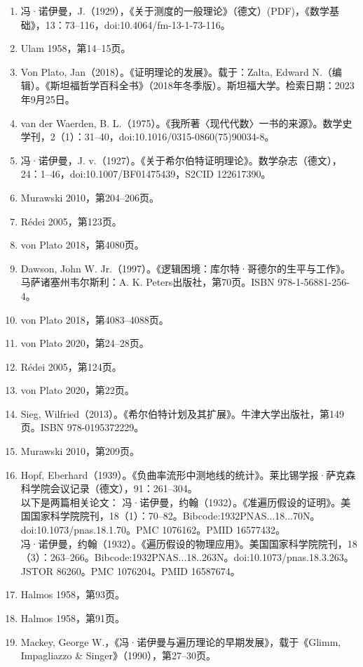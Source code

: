 \begin{enumerate}
\item 冯·诺伊曼，J.（1929），《关于测度的一般理论》（德文）(PDF)，《数学基础》，13：73–116，doi:10.4064/fm-13-1-73-116。  
\item Ulam 1958，第14–15页。  
\item Von Plato, Jan（2018）。《证明理论的发展》。载于：Zalta, Edward N.（编辑）。《斯坦福哲学百科全书》（2018年冬季版）。斯坦福大学。检索日期：2023年9月25日。  
\item van der Waerden, B. L.（1975）。《我所著〈现代代数〉一书的来源》。数学史学刊，2（1）：31–40，doi:10.1016/0315-0860(75)90034-8。  
\item 冯·诺伊曼，J. v.（1927）。《关于希尔伯特证明理论》。数学杂志（德文），24：1–46，doi:10.1007/BF01475439，S2CID 122617390。  
\item Murawski 2010，第204–206页。  
\item Rédei 2005，第123页。  
\item von Plato 2018，第4080页。  
\item Dawson, John W. Jr.（1997）。《逻辑困境：库尔特·哥德尔的生平与工作》。马萨诸塞州韦尔斯利：A. K. Peters出版社，第70页。ISBN 978-1-56881-256-4。  
\item von Plato 2018，第4083–4088页。  
\item von Plato 2020，第24–28页。  
\item Rédei 2005，第124页。  
\item von Plato 2020，第22页。  
\item Sieg, Wilfried（2013）。《希尔伯特计划及其扩展》。牛津大学出版社，第149页。ISBN 978-0195372229。  
\item Murawski 2010，第209页。  
\item Hopf, Eberhard（1939）。《负曲率流形中测地线的统计》。莱比锡学报·萨克森科学院会议记录（德文），91：261–304。\\  
以下是两篇相关论文：  
冯·诺伊曼，约翰（1932）。《准遍历假设的证明》。美国国家科学院院刊，18（1）：70–82。Bibcode:1932PNAS...18...70N。doi:10.1073/pnas.18.1.70。PMC 1076162。PMID 16577432。\\  
冯·诺伊曼，约翰（1932）。《遍历假设的物理应用》。美国国家科学院院刊，18（3）：263–266。Bibcode:1932PNAS...18..263N。doi:10.1073/pnas.18.3.263。JSTOR 86260。PMC 1076204。PMID 16587674。\\
\item Halmos 1958，第93页。  
\item Halmos 1958，第91页。  
\item Mackey, George W.，《冯·诺伊曼与遍历理论的早期发展》，载于《Glimm, Impagliazzo & Singer》（1990），第27–30页。  

\end{enumerate}
